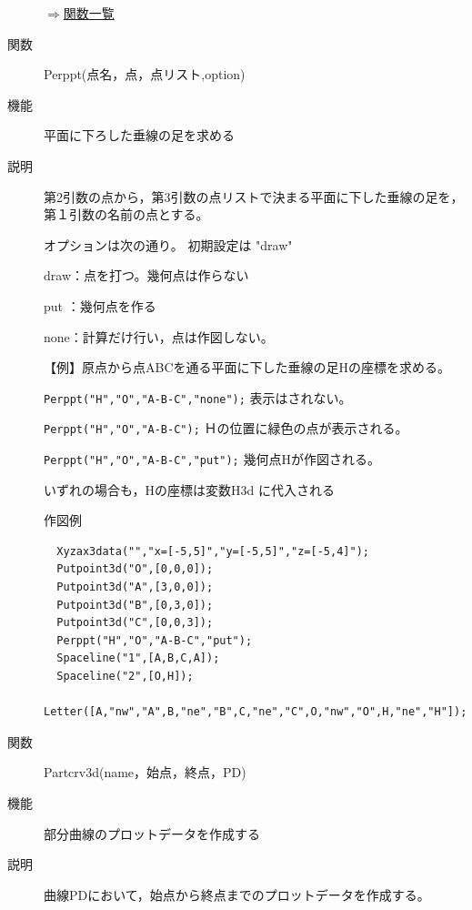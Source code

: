 \documentclass[papersize,a4paper,12pt,uplatex]{jsarticle}
\begin{document}
\begin{description}
\begin{flushright} \hyperlink{functionlist}{$\Rightarrow$関数一覧}\end{flushright}
\vspace{\baselineskip}

\hypertarget{perppt}{}
\item[関数]  Perppt(点名，点，点リスト,option)
\item[機能]  平面に下ろした垂線の足を求める
\item[説明]  第2引数の点から，第3引数の点リストで決まる平面に下した垂線の足を，第１引数の名前の点とする。

オプションは次の通り。 初期設定は "draw"

draw：点を打つ。幾何点は作らない

put ：幾何点を作る

none：計算だけ行い，点は作図しない。

\vspace{\baselineskip}
【例】原点から点ABCを通る平面に下した垂線の足Hの座標を求める。

 \verb|Perppt("H","O","A-B-C","none");|   表示はされない。
 
 \verb|Perppt("H","O","A-B-C");|         Ｈの位置に緑色の点が表示される。
 
 \verb|Perppt("H","O","A-B-C","put");|     幾何点Hが作図される。
 
  いずれの場合も，Hの座標は変数H3d に代入される
  
\vspace{\baselineskip}
作図例
\begin{verbatim}
  Xyzax3data("","x=[-5,5]","y=[-5,5]","z=[-5,4]");
  Putpoint3d("O",[0,0,0]);
  Putpoint3d("A",[3,0,0]);
  Putpoint3d("B",[0,3,0]);
  Putpoint3d("C",[0,0,3]);
  Perppt("H","O","A-B-C","put");
  Spaceline("1",[A,B,C,A]);
  Spaceline("2",[O,H]);
  Letter([A,"nw","A",B,"ne","B",C,"ne","C",O,"nw","O",H,"ne","H"]);
\end{verbatim}

\vspace{\baselineskip}
\begin{center}  \end{center}

\vspace{\baselineskip}
\hypertarget{partcrv3d}{}
\item[関数]  Partcrv3d(name，始点，終点，PD)
\item[機能]  部分曲線のプロットデータを作成する
\item[説明]  曲線PDにおいて，始点から終点までのプロットデータを作成する。


\end{description}
\end{document}
